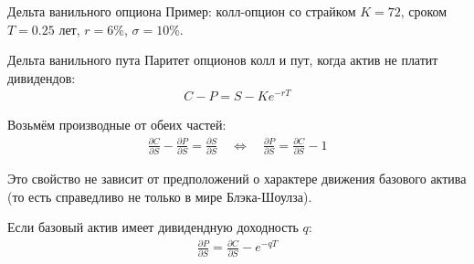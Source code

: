 \documentclass{beamer}
\begin{document}
\begin{frame}{Дельта ванильного опциона}
\justify
Пример: колл-опцион со страйком $K=72$, сроком $T=0.25$ лет, $r=6\%$, $\sigma=10\%$.

\centering
{}
\end{frame}



\begin{frame}{Дельта ванильного пута}
\justify
Паритет опционов колл и пут, когда актив не платит дивидендов:
\begin{align*}
C - P = S - Ke^{-rT}
\end{align*}

\justify
Возьмём производные от обеих частей:
\begin{align*}
\frac{\partial C}{\partial S} - \frac{\partial P}{\partial S} = \frac{\partial S}{\partial S} \quad \Leftrightarrow \quad \frac{\partial P}{\partial S} = \frac{\partial C}{\partial S} - 1
\end{align*}

\justify
Это свойство не зависит от предположений о характере движения базового актива (то есть
справедливо не только в мире Блэка-Шоулза).

\justify
Если базовый актив имеет дивидендную доходность $q$:
\begin{align*}
\frac{\partial P}{\partial S} = \frac{\partial C}{\partial S} - e^{-qT}
\end{align*}
\end{frame}
\end{document}
